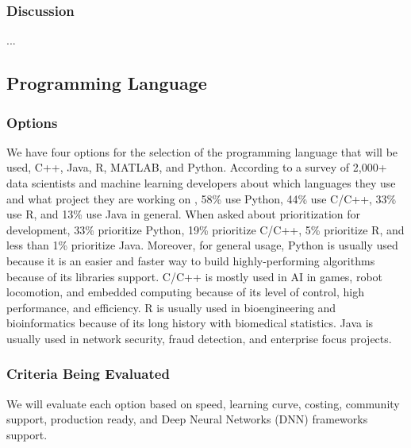 \subsubsection{Discussion}
...

\subsection{Programming Language}

\subsubsection{Options}

We have four options for the selection of the programming language that will be used, C++, Java, R, MATLAB, and Python. According to a survey of 2,000+ data scientists and machine learning developers about which languages they use and what project they are working on \cite{pl1}, 58\% use Python, 44\% use C/C++, 33\% use R, and 13\% use Java in general. When asked about prioritization for development, 33\% prioritize Python, 19\% prioritize C/C++, 5\% prioritize R, and less than 1\% prioritize Java. Moreover, for general usage, Python is usually used because it is an easier and faster way to build highly-performing algorithms because of its libraries support. C/C++ is mostly used in AI in games, robot locomotion, and embedded computing because of its level of control, high performance, and efficiency. R is usually used in bioengineering and bioinformatics because of its long history with biomedical statistics. Java is usually used in network security, fraud detection, and enterprise focus projects.

\subsubsection{Criteria Being Evaluated}

We will evaluate each option based on speed, learning curve, costing, community support, production ready, and Deep Neural Networks (DNN) frameworks support.

